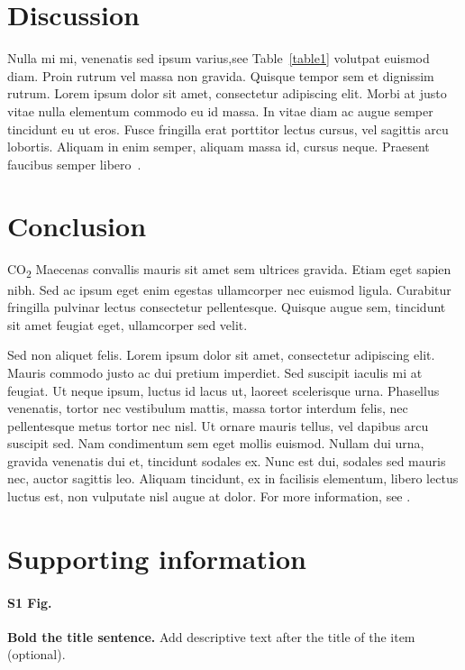 \documentclass[
  10pt,
  letterpaper,
]{article}
\begin{document}
\hypertarget{discussion}{%
\section{Discussion}\label{discussion}}

Nulla mi mi, venenatis sed ipsum varius,see Table~\ref{table1} volutpat
euismod diam. Proin rutrum vel massa non gravida. Quisque tempor sem et
dignissim rutrum. Lorem ipsum dolor sit amet, consectetur adipiscing
elit. Morbi at justo vitae nulla elementum commodo eu id massa. In vitae
diam ac augue semper tincidunt eu ut eros. Fusce fringilla erat
porttitor lectus cursus, vel sagittis arcu lobortis. Aliquam in enim
semper, aliquam massa id, cursus neque. Praesent faucibus semper
libero~\citep{bib3}.

\hypertarget{conclusion}{%
\section{Conclusion}\label{conclusion}}

CO\textsubscript{2} Maecenas convallis mauris sit amet sem ultrices
gravida. Etiam eget sapien nibh. Sed ac ipsum eget enim egestas
ullamcorper nec euismod ligula. Curabitur fringilla pulvinar lectus
consectetur pellentesque. Quisque augue sem, tincidunt sit amet feugiat
eget, ullamcorper sed velit.

Sed non aliquet felis. Lorem ipsum dolor sit amet, consectetur
adipiscing elit. Mauris commodo justo ac dui pretium imperdiet. Sed
suscipit iaculis mi at feugiat. Ut neque ipsum, luctus id lacus ut,
laoreet scelerisque urna. Phasellus venenatis, tortor nec vestibulum
mattis, massa tortor interdum felis, nec pellentesque metus tortor nec
nisl. Ut ornare mauris tellus, vel dapibus arcu suscipit sed. Nam
condimentum sem eget mollis euismod. Nullam dui urna, gravida venenatis
dui et, tincidunt sodales ex. Nunc est dui, sodales sed mauris nec,
auctor sagittis leo. Aliquam tincidunt, ex in facilisis elementum,
libero lectus luctus est, non vulputate nisl augue at dolor. For more
information, see .

\hypertarget{supporting-information}{%
\section{Supporting information}\label{supporting-information}}

\paragraph*{S1 Fig.}
\label{s1-fig}
{\textbf{Bold the title sentence.}} Add descriptive text after the title
of the item (optional).
\end{document}
